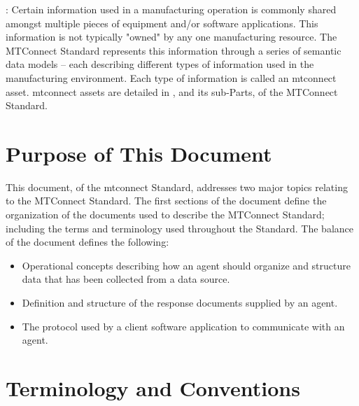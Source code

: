 :  Certain information used in a manufacturing operation is commonly shared amongst multiple pieces of equipment and/or software applications.  This information is not typically "owned" by any one manufacturing resource.  The MTConnect Standard represents this information through a series of \glspl{semantic data model} – each describing different types of information used in the manufacturing environment.  Each type of information is called an \gls{mtconnect asset}. \glspl{mtconnect asset} are detailed in , and its sub-Parts, of the MTConnect Standard.

\section{Purpose of This Document}

This document,  of the \gls{mtconnect}  Standard, addresses two major topics relating to the MTConnect Standard.  The first sections of the document define the organization of the documents used to describe the MTConnect Standard; including the terms and terminology used throughout the Standard.  The balance of the document defines the following:

\begin{itemize}
\item Operational concepts describing how an \gls{agent} should organize and structure data that has been collected from a data source.

\item Definition and structure of the \glspl{response document} supplied by an \gls{agent}.

\item The protocol used by a client software application to communicate with an \gls{agent}.
\end{itemize}

\section{Terminology and Conventions} \label{sec:Terminology and Conventions} 

\printglossary


\printbibliography[title=MTConnect References,keyword=MTC]


\printbibliography[title=Other References,notkeyword=MTC]

\nolinenumbers
\glsaddallunused
\nolinenumbers

\linenumbers